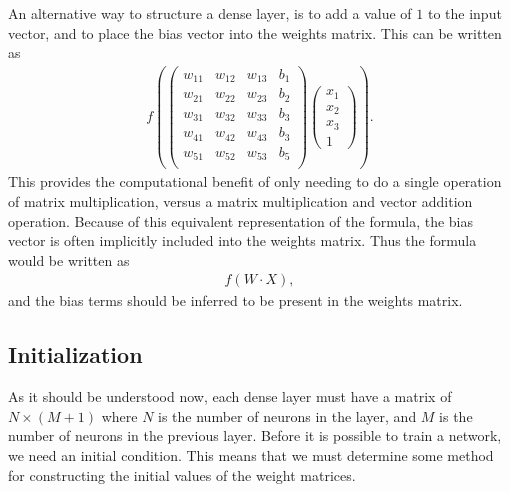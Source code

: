 \documentclass[10pt]{amsart}
\begin{document}
\begin{multicols}{2}
  An alternative way to structure a dense layer, is to add a value of $1$ to
  the input vector, and to place the bias vector into the weights matrix. This
  can be written as
  \begin{align*}
    f\left(\begin{pmatrix}
        w_{11} & w_{12} & w_{13} & b_1\\
        w_{21} & w_{22} & w_{23} & b_2\\
        w_{31} & w_{32} & w_{33} & b_3\\
        w_{41} & w_{42} & w_{43} & b_3\\
        w_{51} & w_{52} & w_{53} & b_5\\
      \end{pmatrix}
      \begin{pmatrix}
        x_1 \\
        x_2 \\
        x_3 \\
        1
      \end{pmatrix}
    \right).
  \end{align*}
  This provides the computational benefit of only needing to do a single
  operation of matrix multiplication, versus a matrix multiplication and vector
  addition operation. Because of this equivalent representation of the formula,
  the bias vector is often implicitly included into the weights matrix. Thus
  the formula would be written as
  \begin{align}\label{eq:dense_f2}
    f(W\cdot X),
  \end{align}
  and the bias terms should be inferred to be present in the weights matrix.

  \subsection{Initialization}%
  \label{sub:initialization}

  As it should be understood now, each dense layer must have a matrix of
  $N\times (M+1)$ where $N$ is the number of neurons in the layer, and $M$ is
  the number of neurons in the previous layer. Before it is possible to train a
  network, we need an initial condition. This means that we must determine some
  method for constructing the initial values of the weight matrices.


\end{multicols}
\end{document}
